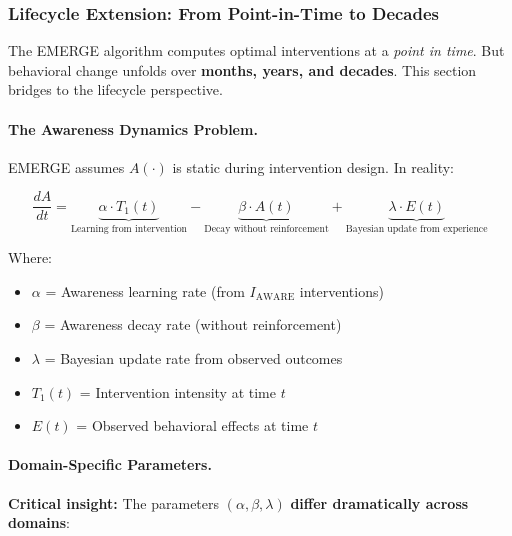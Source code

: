 \subsubsection{Lifecycle Extension: From Point-in-Time to Decades}
\label{subsubsec:lifecycle-extension}

The EMERGE algorithm computes optimal interventions at a \emph{point in time}. But behavioral change unfolds over \textbf{months, years, and decades}. This section bridges to the lifecycle perspective.

\paragraph{The Awareness Dynamics Problem.}

EMERGE assumes $A(·)$ is static during intervention design. In reality:

\begin{equation}
\frac{dA}{dt} = \underbrace{\alpha \cdot T_1(t)}_{\text{Learning from intervention}} - \underbrace{\beta \cdot A(t)}_{\text{Decay without reinforcement}} + \underbrace{\lambda \cdot E(t)}_{\text{Bayesian update from experience}}
\end{equation}

Where:
\begin{itemize}[nosep]
    \item $\alpha$ = Awareness learning rate (from $I_{\text{AWARE}}$ interventions)
    \item $\beta$ = Awareness decay rate (without reinforcement)
    \item $\lambda$ = Bayesian update rate from observed outcomes
    \item $T_1(t)$ = Intervention intensity at time $t$
    \item $E(t)$ = Observed behavioral effects at time $t$
\end{itemize}

\paragraph{Domain-Specific Parameters.}

\textbf{Critical insight:} The parameters $(\alpha, \beta, \lambda)$ \textbf{differ dramatically across domains}:

